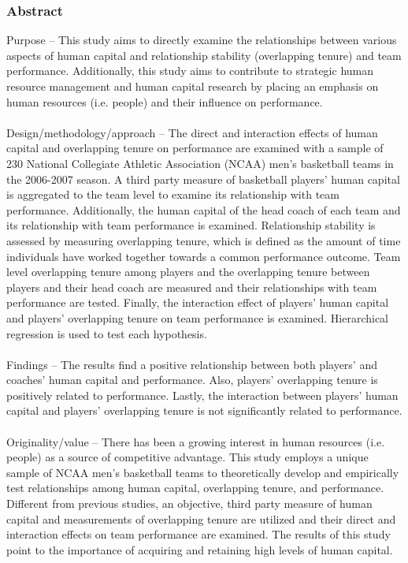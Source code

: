 \documentclass[12pt]{article}
\begin{document}
\subsubsection*{Abstract}
Purpose – This study aims to directly examine the relationships between various aspects of human capital and relationship stability (overlapping tenure) and team performance. Additionally, this study aims to contribute to strategic human resource management and human capital research by placing an emphasis on human resources (i.e. people) and their influence on performance. \\\\
Design/methodology/approach – The direct and interaction effects of human capital and overlapping tenure on performance are examined with a sample of 230 National Collegiate Athletic Association (NCAA) men’s basketball teams in the 2006-2007 season. A third party measure of basketball players’ human capital is aggregated to the team level to examine its relationship with team performance. Additionally, the human capital of the head coach of each team and its relationship with team performance is examined. Relationship stability is assessed by measuring overlapping tenure, which is defined as the amount of time individuals have worked together towards a common performance outcome. Team level overlapping tenure among players and the overlapping tenure between players and their head coach are measured and their relationships with team performance are tested. Finally, the interaction effect of players’ human capital and players’ overlapping tenure on team performance is examined. Hierarchical regression is used to test each hypothesis.\\\\
Findings – The results find a positive relationship between both players’ and coaches’ human capital and performance. Also, players’ overlapping tenure is positively related to performance. Lastly, the interaction between players’ human capital and players’ overlapping tenure is not significantly related to performance.\\\\
Originality/value – There has been a growing interest in human resources (i.e. people) as a source of competitive advantage. This study employs a unique sample of NCAA men’s basketball teams to theoretically develop and empirically test relationships among human capital, overlapping tenure, and performance. Different from previous studies, an objective, third party measure of human capital and measurements of overlapping tenure are utilized and their direct and interaction effects on team performance are examined. The results of this study point to the importance of acquiring and retaining high levels of human capital.
\end{document}
